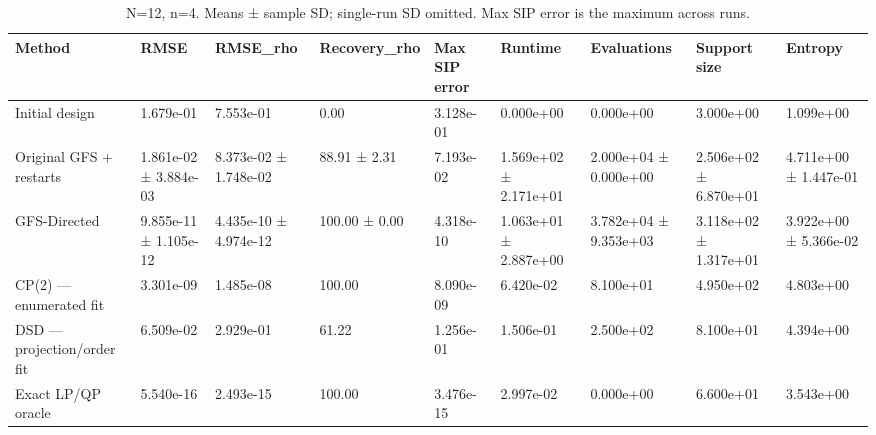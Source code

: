 \begin{table}
\caption{N=12, n=4. Means ± sample SD; single-run SD omitted. Max SIP error is the maximum across runs.}
\begin{tabular}{lllllllll}
\toprule
Method & RMSE & RMSE\_rho & Recovery\_rho & Max SIP error & Runtime & Evaluations & Support size & Entropy \\
\midrule
Initial design & 1.679e-01 & 7.553e-01 & 0.00 & 3.128e-01 & 0.000e+00 & 0.000e+00 & 3.000e+00 & 1.099e+00 \\
Original GFS + restarts & 1.861e-02 ± 3.884e-03 & 8.373e-02 ± 1.748e-02 & 88.91 ± 2.31 & 7.193e-02 & 1.569e+02 ± 2.171e+01 & 2.000e+04 ± 0.000e+00 & 2.506e+02 ± 6.870e+01 & 4.711e+00 ± 1.447e-01 \\
GFS-Directed & 9.855e-11 ± 1.105e-12 & 4.435e-10 ± 4.974e-12 & 100.00 ± 0.00 & 4.318e-10 & 1.063e+01 ± 2.887e+00 & 3.782e+04 ± 9.353e+03 & 3.118e+02 ± 1.317e+01 & 3.922e+00 ± 5.366e-02 \\
CP(2) — enumerated fit & 3.301e-09 & 1.485e-08 & 100.00 & 8.090e-09 & 6.420e-02 & 8.100e+01 & 4.950e+02 & 4.803e+00 \\
DSD — projection/order fit & 6.509e-02 & 2.929e-01 & 61.22 & 1.256e-01 & 1.506e-01 & 2.500e+02 & 8.100e+01 & 4.394e+00 \\
Exact LP/QP oracle & 5.540e-16 & 2.493e-15 & 100.00 & 3.476e-15 & 2.997e-02 & 0.000e+00 & 6.600e+01 & 3.543e+00 \\
\bottomrule
\end{tabular}
\end{table}
